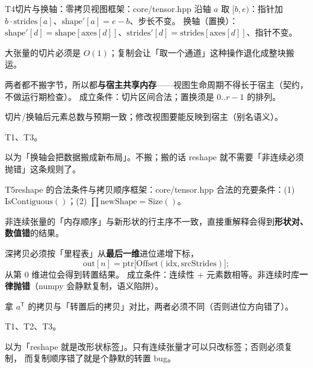 \begin{know}{T4}{切片与换轴：零拷贝视图}{框架：core/tensor.hpp}
 沿轴 $a$ 取 $[b,e)$：指针加 $b\cdot\text{strides}[a]$、$\text{shape}'[a]=e-b$、步长不变。
换轴（置换）：$\text{shape}'[d]=\text{shape}[\text{axes}[d]]$、$\text{strides}'[d]=\text{strides}[\text{axes}[d]]$、指针不变。

 大张量的切片必须是 $O(1)$；复制会让「取一个通道」这种操作退化成整块搬运。

 两者都不搬字节，所以都\textbf{与宿主共享内存}——视图生命周期不得长于宿主（契约，不做运行期检查）。
成立条件：切片区间合法；置换须是 $0..r-1$ 的排列。

 切片/换轴后元素总数与预期一致；修改视图要能反映到宿主（别名语义）。

 T1、T3。

 以为「换轴会把数据搬成新布局」。不搬；搬的话 reshape 就不需要「非连续必须抛错」这条规则了。
\end{know}

\begin{know}{T5}{reshape 的合法条件与拷贝顺序}{框架：core/tensor.hpp}
 合法的充要条件：(1) $\text{IsContiguous}()$；(2) $\prod\text{newShape}=\text{Size}()$。

 非连续张量的「内存顺序」与新形状的行主序不一致，直接重解释会得到\textbf{形状对、数值错}的结果。

 深拷贝必须按「里程表」从\textbf{最后一维}进位递增下标，
\[\text{out}[n]=\text{ptr}\big[\text{Offset}(\text{idx},\text{srcStrides})\big];\]
从第 0 维进位会得到转置结果。
成立条件：连续性 + 元素数相等。非连续时库\textbf{一律抛错}（numpy 会静默复制，语义陷阱）。

 拿 $a^{\mathsf T}$ 的拷贝与「转置后的拷贝」对比，两者必须不同（否则进位方向错了）。

 T1、T2、T3。

 以为「reshape 就是改形状标签」。只有连续张量才可以只改标签；否则必须复制，
而复制顺序错了就是个静默的转置 bug。
\end{know}

